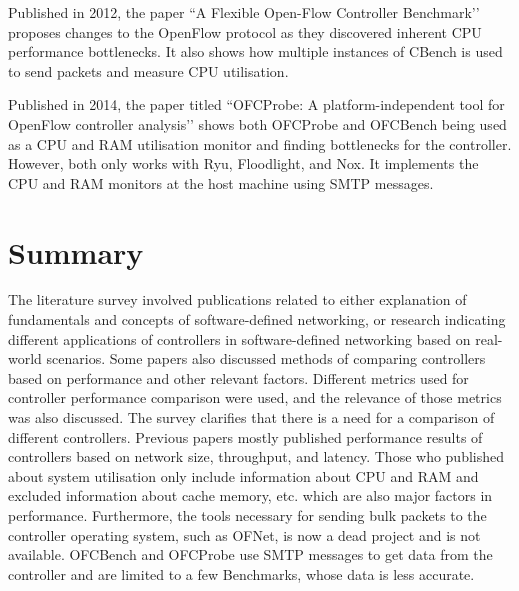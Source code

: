 Published in 2012, the paper ``A Flexible Open-Flow Controller Benchmark’’ \cite{flexible} proposes changes to the OpenFlow protocol as they discovered inherent CPU performance bottlenecks. It also shows how multiple instances of CBench is used to send packets and measure CPU utilisation.

Published in 2014, the paper titled ``OFCProbe: A platform-independent tool for OpenFlow controller analysis’’ \cite{ofcprobe} shows both OFCProbe and OFCBench being used as a CPU and RAM utilisation monitor and finding bottlenecks for the controller. However, both only works with Ryu, Floodlight, and Nox. It implements the CPU and RAM monitors at the host machine using SMTP messages.

\section*{Summary}

The literature survey involved publications related to either explanation of fundamentals and concepts of software-defined networking, or research indicating different applications of controllers in software-defined networking based on real-world scenarios. Some papers also discussed methods of comparing controllers based on performance and other relevant factors. Different metrics used for controller performance comparison were used, and the relevance of those metrics was also discussed. The survey clarifies that there is a need for a comparison of different controllers. Previous papers mostly published performance results of controllers based on network size, throughput, and latency. Those who published about system utilisation only include information about CPU and RAM and excluded information about cache memory, etc. which are also major factors in performance. Furthermore, the tools necessary for sending bulk packets to the controller operating system, such as OFNet, is now a dead project and is not available. OFCBench and OFCProbe use SMTP messages to get data from the controller and are limited to a few Benchmarks, whose data is less accurate.